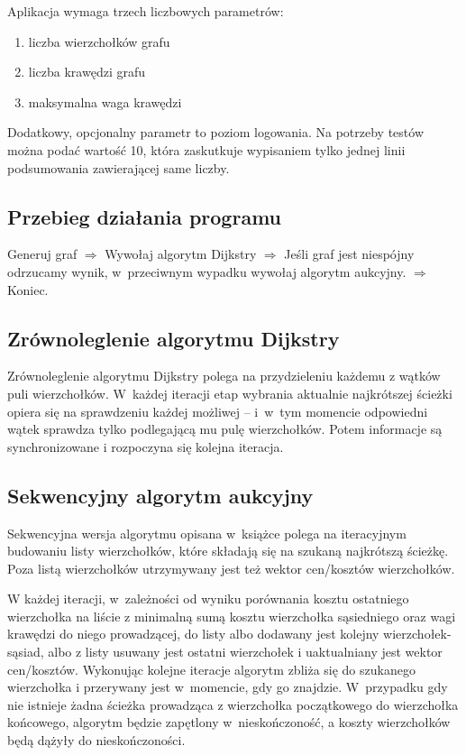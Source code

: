 \documentclass {article}
\begin{document}
Aplikacja wymaga trzech liczbowych parametrów:

\begin{enumerate}
 \item liczba wierzchołków grafu
 \item liczba krawędzi grafu
 \item maksymalna waga krawędzi
\end{enumerate}

Dodatkowy, opcjonalny parametr to poziom logowania. Na potrzeby testów można podać wartość 10, która zaskutkuje wypisaniem tylko jednej linii podsumowania zawierającej same liczby.

\subsection{Przebieg działania programu}

Generuj graf $\Rightarrow$ Wywołaj algorytm Dijkstry $\Rightarrow$ Jeśli graf jest niespójny odrzucamy wynik, w~przeciwnym wypadku wywołaj algorytm aukcyjny. $\Rightarrow$ Koniec.

\subsection{Zrównoleglenie algorytmu Dijkstry}

Zrównoleglenie algorytmu Dijkstry polega na przydzieleniu każdemu z wątków puli wierzchołków. W~każdej iteracji etap wybrania aktualnie najkrótszej ścieżki opiera się na sprawdzeniu każdej możliwej -- i~w~tym momencie odpowiedni wątek sprawdza tylko podlegającą mu pulę wierzchołków. Potem informacje są synchronizowane i rozpoczyna się kolejna iteracja.

\subsection{Sekwencyjny algorytm aukcyjny}

Sekwencyjna wersja algorytmu opisana w~książce \cite{Bertsekas1998} polega na iteracyjnym budowaniu listy wierzchołków, które składają się na szukaną najkrótszą ścieżkę. Poza listą wierzchołków utrzymywany jest też wektor cen/kosztów wierzchołków.

W każdej iteracji, w~zależności od wyniku porównania kosztu ostatniego wierzchołka na liście z minimalną sumą kosztu wierzchołka sąsiedniego oraz wagi krawędzi do niego prowadzącej, do listy albo dodawany jest kolejny wierzchołek-sąsiad, albo z listy usuwany jest ostatni wierzchołek i uaktualniany jest wektor cen/kosztów. Wykonując kolejne iteracje algorytm zbliża się do szukanego wierzchołka i przerywany jest w~momencie, gdy go znajdzie. W~przypadku gdy nie istnieje żadna ścieżka prowadząca z wierzchołka początkowego do wierzchołka końcowego, algorytm będzie zapętlony w~nieskończoność, a koszty wierzchołków będą dążyły do nieskończoności.
\end{document}
